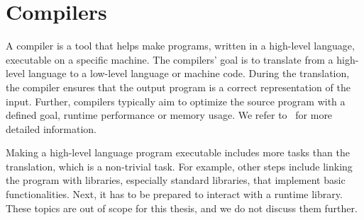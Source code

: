 \section{Compilers}
\label{sec:bg:compilers}
A compiler is a tool that helps make programs, written in a high-level language, executable on a specific machine.
The compilers' goal is to translate from a high-level language to a low-level language or machine code.
During the translation, the compiler ensures that the output program is a correct representation of the input.
Further, compilers typically aim to optimize the source program with a defined goal, \eg runtime performance or memory usage.
We refer to~\cite{engineeringcompiler2007} for more detailed information.

Making a high-level language program executable includes more tasks than the translation, which is a non-trivial task.
For example, other steps include linking the program with libraries, especially standard libraries, that implement basic functionalities.
Next, it has to be prepared to interact with a runtime library.
These topics are out of scope for this thesis, and we do not discuss them further.

